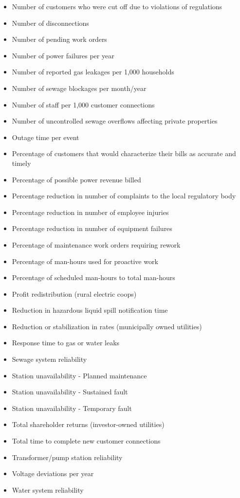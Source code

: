 \documentclass[]{book}
\begin{document}
\begin{itemize}
\item
  Number of customers who were cut off due to violations of regulations
\item
  Number of disconnections
\item
  Number of pending work orders
\item
  Number of power failures per year
\item
  Number of reported gas leakages per 1,000 households
\item
  Number of sewage blockages per month/year
\item
  Number of staff per 1,000 customer connections
\item
  Number of uncontrolled sewage overflows affecting private properties
\item
  Outage time per event
\item
  Percentage of customers that would characterize their bills as
  accurate and timely
\item
  Percentage of possible power revenue billed
\item
  Percentage reduction in number of complaints to the local regulatory
  body
\item
  Percentage reduction in number of employee injuries
\item
  Percentage reduction in number of equipment failures
\item
  Percentage of maintenance work orders requiring rework
\item
  Percentage of man-hours used for proactive work
\item
  Percentage of scheduled man-hours to total man-hours
\item
  Profit redistribution (rural electric coops)
\item
  Reduction in hazardous liquid spill notification time
\item
  Reduction or stabilization in rates (municipally owned utilities)
\item
  Response time to gas or water leaks
\item
  Sewage system reliability
\item
  Station unavailability - Planned maintenance
\item
  Station unavailability - Sustained fault
\item
  Station unavailability - Temporary fault
\item
  Total shareholder returns (investor-owned utilities)
\item
  Total time to complete new customer connections
\item
  Transformer/pump station reliability
\item
  Voltage deviations per year
\item
  Water system reliability
\end{itemize}
\end{document}
